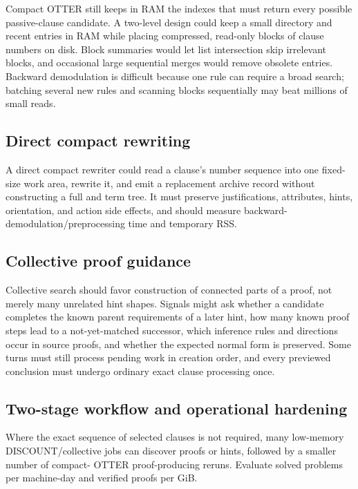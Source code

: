 \documentclass[11pt]{article}
\newcommand{\setting}[1]{\texttt{\detokenize{#1}}}
\begin{document}
Compact OTTER still keeps in RAM the indexes that must return every possible
passive-clause candidate.  A two-level design could keep a small directory and
recent entries in RAM while placing compressed, read-only blocks of clause
numbers on disk.  Block summaries would let list intersection skip irrelevant
blocks, and occasional large sequential merges would remove obsolete entries.
Backward demodulation is difficult because one rule can require a broad search;
batching several new rules and scanning blocks sequentially may beat millions
of small reads.

\subsection{Direct compact rewriting}

A direct compact rewriter could read a clause's number sequence into one
fixed-size work area, rewrite it, and emit a replacement archive record without
constructing a full \setting{Topform} and term tree.  It must preserve
justifications, attributes, hints, orientation, and action side effects, and
should measure backward-demodulation/preprocessing time and temporary RSS.

\subsection{Collective proof guidance}

Collective search should favor construction of connected parts of a proof, not
merely many unrelated hint shapes.  Signals might ask whether a candidate
completes the known parent requirements of a later hint, how many known proof
steps lead to a not-yet-matched successor, which inference rules and directions
occur in source proofs, and whether the expected normal form is preserved.
Some turns must still process pending work in creation order, and every
previewed conclusion must undergo ordinary exact clause processing once.

\subsection{Two-stage workflow and operational hardening}

Where the exact sequence of selected clauses is not required, many low-memory
DISCOUNT/collective
jobs can discover proofs or hints, followed by a smaller number of compact-
OTTER proof-producing reruns.  Evaluate solved problems per machine-day and
verified proofs per GiB.
\end{document}
